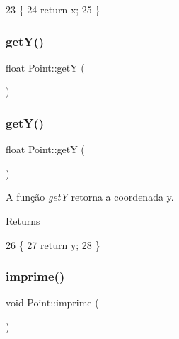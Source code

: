 \begin{DoxyCode}
23                  \{
24      \textcolor{keywordflow}{return} x;
25 \}
\end{DoxyCode}
\mbox{\label{class_point_a3cccbca94719ddde353cce86ce0e2f64}} 
\subsubsection{\texorpdfstring{get\+Y()}{getY()}\hspace{0.1cm}{\footnotesize\ttfamily [1/2]}}
{\footnotesize\ttfamily float Point\+::getY (\begin{DoxyParamCaption}{ }\end{DoxyParamCaption})}

\mbox{\label{class_point_a3cccbca94719ddde353cce86ce0e2f64}} 
\subsubsection{\texorpdfstring{get\+Y()}{getY()}\hspace{0.1cm}{\footnotesize\ttfamily [2/2]}}
{\footnotesize\ttfamily float Point\+::getY (\begin{DoxyParamCaption}{ }\end{DoxyParamCaption})}



A função {\itshape getY} retorna a coordenada y. 

\begin{DoxyReturn}{Returns}

\end{DoxyReturn}

\begin{DoxyCode}
26                  \{
27      \textcolor{keywordflow}{return} y;
28 \}
\end{DoxyCode}
\mbox{\label{class_point_a1fb5c2501c27ab2cbc99d06c2a26a741}} 
\subsubsection{\texorpdfstring{imprime()}{imprime()}\hspace{0.1cm}{\footnotesize\ttfamily [1/2]}}
{\footnotesize\ttfamily void Point\+::imprime (\begin{DoxyParamCaption}{ }\end{DoxyParamCaption})}

